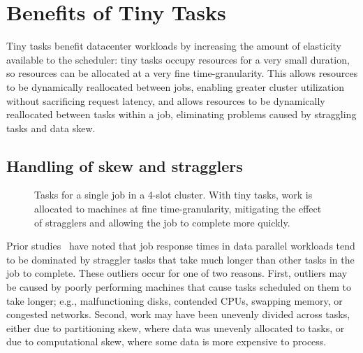 \section{Benefits of Tiny Tasks}
\label{sec:benefits}

Tiny tasks benefit datacenter workloads by increasing the amount of elasticity
available to the scheduler: tiny tasks occupy resources for a very small
duration, so resources can be allocated at a very fine time-granularity. This
allows resources to be dynamically reallocated between jobs, enabling greater
cluster utilization without sacrificing request latency, and allows
resources to be dynamically
reallocated between tasks within a job, eliminating problems caused
by straggling tasks and data skew.

\subsection{Handling of skew and stragglers}

\begin{figure}[t]
\vspace{-0.2in}
\centering
{}
\vspace{-0.1in}
\caption{Tasks for a single job in a 4-slot cluster.
With tiny tasks, work is allocated to machines at fine
time-granularity, mitigating the effect of stragglers and allowing
the job to complete more quickly.}
\vspace{-2ex}
\label{fig:tiny_diagram}
\end{figure}


Prior studies~\cite{ananthanarayanan2010reining,zaharia2008improving} have
noted that job response times in data parallel workloads tend to be
dominated by straggler tasks that take much longer than other tasks in the
job to complete.
These outliers occur for one of two reasons.
First, outliers may be caused by poorly performing machines that cause tasks scheduled
on them to take longer; e.g.,
malfunctioning disks, contended CPUs, swapping memory, or congested networks.
Second, work may have been unevenly
divided across tasks, either due to
partitioning skew, where data was unevenly allocated to tasks, or due to
computational skew, where some data is more expensive to process.

